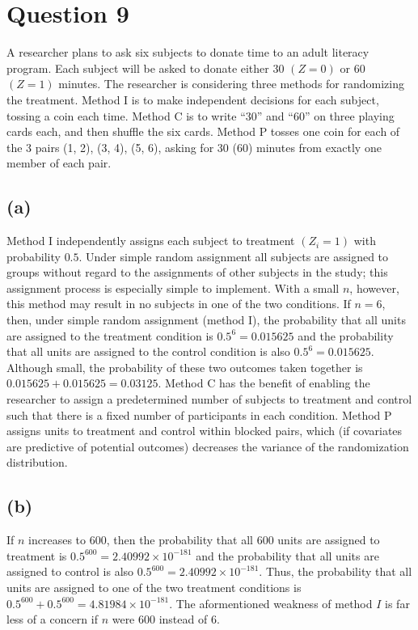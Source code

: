 \documentclass[11pt]{article}\usepackage[]{graphicx}\usepackage[]{color}
\theoremstyle{newstyle}
\begin{document}
\section{Question 9}

A researcher plans to ask six subjects to donate time to an adult literacy program. Each subject will be asked to donate either $30$ $(Z = 0)$ or $60$ $(Z = 1)$ minutes. The researcher is considering three methods for randomizing the treatment. Method I is to make independent decisions for each subject, tossing a coin each time. Method C is to write ``30'' and ``60'' on three playing cards each, and then shuffle the six cards. Method P tosses one coin for each of the 3 pairs (1, 2), (3, 4), (5, 6), asking for 30 (60) minutes from exactly one member of each pair.

\subsection{(a)}

Method I independently assigns each subject to treatment $(Z_i=1)$ with probability $0.5$. Under simple random assignment all subjects are assigned to groups without regard to the assignments of other subjects in the study; this assignment process is especially simple to implement. With a small $n$, however, this method may result in no subjects in one of the two conditions. If $n = 6$, then, under simple random assignment (method I), the probability that all units are assigned to the treatment condition is $0.5^6 = 0.015625$ and the probability that all units are assigned to the control condition is also $0.5^6 = 0.015625$. Although small, the probability of these two outcomes taken together is $0.015625 + 0.015625 = 0.03125$. Method C has the benefit of enabling the researcher to assign a predetermined number of subjects to treatment and control such that there is a fixed number of participants in each condition. Method P assigns units to treatment and control within blocked pairs, which (if covariates are predictive of potential outcomes) decreases the variance of the randomization distribution.

\subsection{(b)}

If $n$ increases to $600$, then the probability that all $600$ units are assigned to treatment is $0.5^{600} = 2.40992 \times 10^{-181}$ and the probability that all units are assigned to control is also $0.5^{600} = 2.40992 \times 10^{-181}$. Thus, the probability that all units are assigned to one of the two treatment conditions is $0.5^{600} + 0.5^{600} = 4.81984 \times 10^{-181}$. The aformentioned weakness of method $I$ is far less of a concern if $n$ were $600$ instead of $6$.
\end{document}
